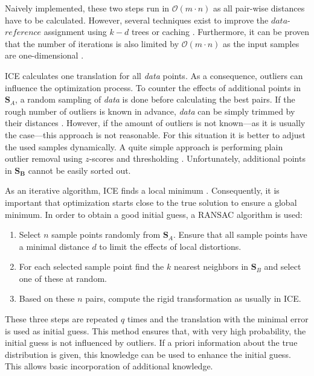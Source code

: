 \documentclass[conference]{IEEEtran}
\theoremstyle{examplestyle}
\begin{document}
Naively implemented, these two steps run in \(\mathcal{O}(m \cdot n)\) as all pair-wise distances have to be calculated. However, several techniques exist to improve the \(data\)-\(reference\) assignment using \(k-d\) trees or caching \cite{Pomerleau2015}. Furthermore, it can be proven that the number of iterations is also limited by \(\mathcal{O}(m \cdot n)\) as the input samples are one-dimensional \cite{Ezra2008}.

\ac{ICE} calculates one translation for all \textit{data} points. As a consequence, outliers can influence the optimization process. To counter the effects of additional points in \(\pmb{S}_A\), a random sampling of \textit{data} is done before calculating the best pairs. If the rough number of outliers is known in advance, \textit{data} can be simply trimmed by their distances \cite{Chetverikov2002}. However, if the amount of outliers is not known---as it is usually the case---this approach is not reasonable. For this situation it is better to adjust the used samples dynamically. A quite simple approach is performing plain outlier removal using \(z\)-scores and thresholding \cite{Phillips2007}. Unfortunately, additional points in \(\pmb{S_B}\) cannot be easily sorted out.


As an iterative algorithm, \ac{ICE} finds a local minimum \cite{Do2008}. Consequently, it is important that optimization starts close to the true solution to ensure a global minimum. In order to obtain a good initial guess, a \ac{RANSAC} \cite{Fischler1981} algorithm is used:
\begin{enumerate}
	\item Select \(n\) sample points randomly from \(\pmb{S}_A\). Ensure that all sample points have a minimal distance \(d\) to limit the effects of local distortions.
	\item For each selected sample point find the \(k\) nearest neighbors in \(\pmb{S}_B\) and select one of these at random.
	\item Based on these \(n\) pairs, compute the rigid transformation as usually in \ac{ICE}.
\end{enumerate}

These three steps are repeated \(q\) times and the translation with the minimal error is used as initial guess. This method ensures that, with very high probability, the initial guess is not influenced by outliers. If a priori information about the true distribution is given, this knowledge can be used to enhance the initial guess. This allows basic incorporation of additional knowledge.
\end{document}
